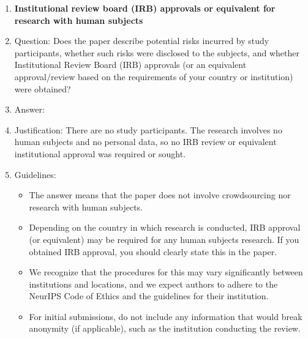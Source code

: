 \begin{enumerate}
\item {\bf Institutional review board (IRB) approvals or equivalent for research with human subjects}
    \item[] Question: Does the paper describe potential risks incurred by study participants, whether such risks were disclosed to the subjects, and whether Institutional Review Board (IRB) approvals (or an equivalent approval/review based on the requirements of your country or institution) were obtained?
    \item[] Answer: \answerNA{}
    \item[] Justification: There are no study participants. The research involves no human subjects and no personal data, so no IRB review or equivalent institutional approval was required or sought.
    \item[] Guidelines:
    \begin{itemize}
        \item The answer \answerNA{} means that the paper does not involve crowdsourcing nor research with human subjects.
        \item Depending on the country in which research is conducted, IRB approval (or equivalent) may be required for any human subjects research. If you obtained IRB approval, you should clearly state this in the paper.
        \item We recognize that the procedures for this may vary significantly between institutions and locations, and we expect authors to adhere to the NeurIPS Code of Ethics and the guidelines for their institution.
        \item For initial submissions, do not include any information that would break anonymity (if applicable), such as the institution conducting the review.
    \end{itemize}


\end{enumerate}
